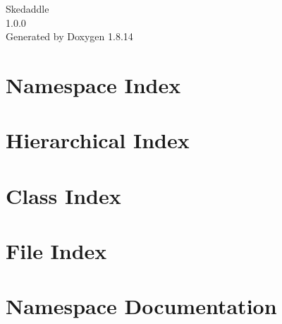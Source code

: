 \documentclass[twoside]{book}
\newcommand{\+}{\discretionary{\mbox{\scriptsize$\hookleftarrow$}}{}{}}
\newcommand{\clearemptydoublepage}{%
  \newpage{\pagestyle{empty}\cleardoublepage}%
}
\begin{document}
\hypersetup{pageanchor=false,
             bookmarksnumbered=true,
             pdfencoding=unicode
            }
\begin{titlepage}
\vspace*{7cm}
\begin{center}%
{\Large Skedaddle \\[1ex]\large 1.\+0.\+0 }\\
\vspace*{1cm}
{\large Generated by Doxygen 1.8.14}\\
\end{center}
\end{titlepage}
\clearemptydoublepage
{}
\tableofcontents
\clearemptydoublepage
{}
\hypersetup{pageanchor=true}

\chapter{Namespace Index}

\chapter{Hierarchical Index}

\chapter{Class Index}

\chapter{File Index}

\chapter{Namespace Documentation}








\end{document}

